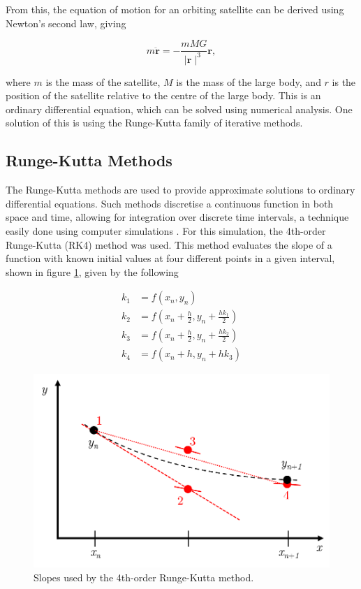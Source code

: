 \documentclass[twocolumn,prl,nobalancelastpage,aps,10pt]{revtex4-1}
\begin{document}
From this, the equation of motion for an orbiting satellite can be derived using Newton's second law, giving \cite{Newton1848}

\begin{equation}\label{equationMotion}
m \bm{\ddot{r}} = - \frac{mMG}{\mid\bm{r}\mid^{3}}\bm{r} ,
\end{equation}

where $m$ is the mass of the satellite, $M$ is the mass of the large body, and $r$ is the position of the satellite relative to the centre of the large body. This is an ordinary differential equation, which can be solved using numerical analysis. One solution of this is using the Runge-Kutta family of iterative methods.

\subsection{Runge-Kutta Methods}

The Runge-Kutta methods are used to provide approximate solutions to ordinary differential equations. Such methods discretise a continuous function in both space and time, allowing for integration over discrete time intervals, a technique easily done using computer simulations \cite{DeVries2011}. For this simulation, the 4th-order Runge-Kutta (RK4) method was used. This method evaluates the slope of a function with known initial values at four different points in a given interval, shown in figure \ref{rk4SlopesFigure}, given by the following \cite{Press2007, Atkinson1989}


\begin{align}
k_{1}& = f(x_{n}, y_{n}) \\
k_{2}& = f(x_{n} + \frac{h}{2}, y_{n} + \frac{hk_{1}}{2})\\
k_{3}& = f(x_{n} + \frac{h}{2}, y_{n} + \frac{hk_{2}}{2})\\
k_{4}& = f(x_{n} + h, y_{n} + hk_{3})
\end{align}

\begin{figure}[ht]
	\includegraphics*[width=0.96\linewidth,clip]{rk4Slopes}
	\caption{Slopes used by the 4th-order Runge-Kutta method.} \label{rk4SlopesFigure}
\end{figure}
\end{document}
